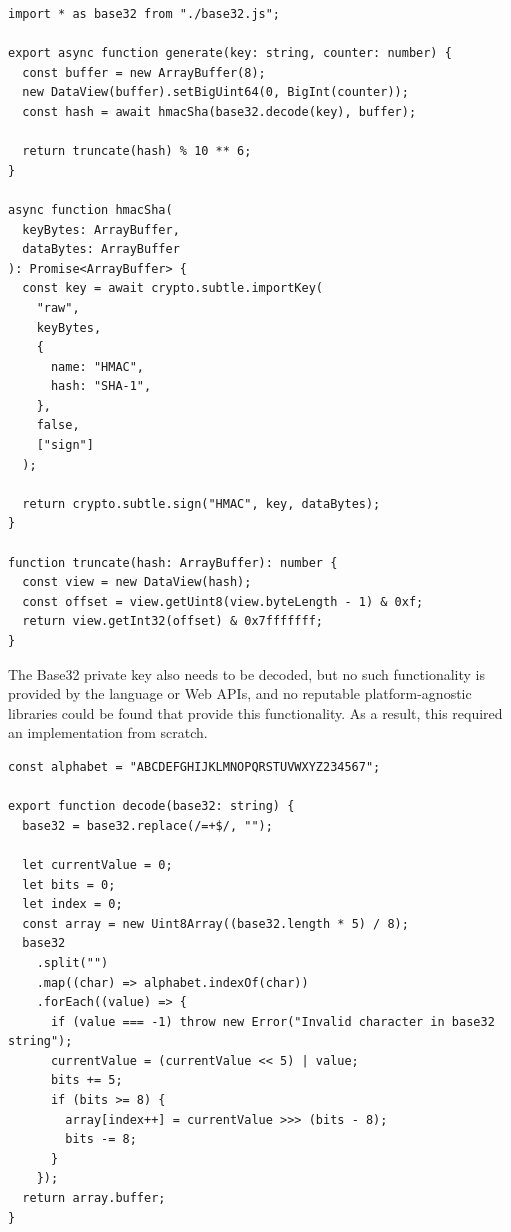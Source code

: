 \begin{listing}[H]
    \begin{verbatim}
import * as base32 from "./base32.js";

export async function generate(key: string, counter: number) {
  const buffer = new ArrayBuffer(8);
  new DataView(buffer).setBigUint64(0, BigInt(counter));
  const hash = await hmacSha(base32.decode(key), buffer);
    
  return truncate(hash) % 10 ** 6;
}

async function hmacSha(
  keyBytes: ArrayBuffer,
  dataBytes: ArrayBuffer
): Promise<ArrayBuffer> {
  const key = await crypto.subtle.importKey(
    "raw",
    keyBytes,
    {
      name: "HMAC",
      hash: "SHA-1",
    },
    false,
    ["sign"]
  );
    
  return crypto.subtle.sign("HMAC", key, dataBytes);
}

function truncate(hash: ArrayBuffer): number {
  const view = new DataView(hash);
  const offset = view.getUint8(view.byteLength - 1) & 0xf;
  return view.getInt32(offset) & 0x7fffffff;
}
    \end{verbatim}
    \caption{HOTP generator in TypeScript}
    \label{lst:hotp-ts}
\end{listing}

The Base32 private key also needs to be decoded, but no such functionality is provided by the language or Web APIs, and no reputable platform-agnostic libraries could be found that provide this functionality. As a result, this required an implementation from scratch.
\begin{listing}[H]
    \begin{verbatim}
const alphabet = "ABCDEFGHIJKLMNOPQRSTUVWXYZ234567";

export function decode(base32: string) {
  base32 = base32.replace(/=+$/, "");

  let currentValue = 0;
  let bits = 0;
  let index = 0;
  const array = new Uint8Array((base32.length * 5) / 8);
  base32
    .split("")
    .map((char) => alphabet.indexOf(char))
    .forEach((value) => {
      if (value === -1) throw new Error("Invalid character in base32 string");
      currentValue = (currentValue << 5) | value;
      bits += 5;
      if (bits >= 8) {
        array[index++] = currentValue >>> (bits - 8);
        bits -= 8;
      }
    });
  return array.buffer;
}
    \end{verbatim}
    \caption{Base32 decoder in TypeScript}
\end{listing}

